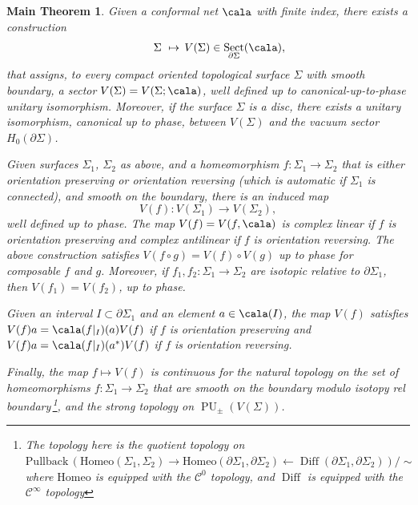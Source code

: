 \documentclass[a4paper,10pt,leqno]{amsart}
\theoremstyle{plain}
\newtheorem{maintheorem}[theorem]{Main Theorem}
\theoremstyle{definition}
\theoremstyle{remark}
\DeclareMathOperator{\Diff}{Diff}
\DeclareMathOperator{\PU}{PU}
\DeclareMathOperator{\Rep}{Sect}
\begin{document}
\begin{maintheorem}\label{Mthm: conformal blocks}
Given a conformal net $\cala$ with finite index, there exists a construction
\begin{equation}\label{eq: main thm eq1}
\qquad\Sigma\,\,\mapsto\, V(\Sigma)\in\Rep_{\partial\Sigma}(\cala),
\end{equation}
that assigns, to every compact oriented topological surface $\Sigma$ with smooth boundary, a sector $V(\Sigma)=V(\Sigma;\cala)$,
well defined up to canonical-up-to-phase unitary isomorphism.
Moreover, if the surface $\Sigma$ is a disc, there exists a unitary isomorphism, canonical up to phase, between $V(\Sigma)$ and the vacuum sector $H_0(\partial\Sigma)$.

Given surfaces $\Sigma_1$, $\Sigma_2$ as above, and a homeomorphism $f:\Sigma_1\to \Sigma_2$ that is 
either orientation preserving or orientation reversing (which is automatic if $\Sigma_1$ is connected), and smooth on the boundary,
there is an induced map
\[
V(f):V(\Sigma_1)\to V(\Sigma_2),
\]
well defined up to phase.
The map $V(f)=V(f,\cala)$ is complex linear if $f$ is orientation preserving and complex antilinear if $f$ is orientation reversing.
The above construction satisfies $V(f\circ g)=V(f)\circ V(g)$ up to phase for composable $f$ and $g$.
Moreover, if $f_1,f_2:\Sigma_1\to \Sigma_2$ are isotopic relative to $\partial \Sigma_1$,
then $V(f_1)=V(f_2)$, up to phase.

Given an interval $I\subset \partial \Sigma_1$ and an element $a\in\cala(I)$,
the map $V(f)$ satisfies $V(f)a=\cala(f|_I)(a)V(f)$ if $f$ is orientation preserving and $V(f)a=\cala(f|_I)(a^*)V(f)$ if $f$ is orientation reversing.

Finally, the map $f\mapsto V(f)$ is continuous for the natural topology on the set of homeomorphisms $f:\Sigma_1\to \Sigma_2$ that are smooth on the boundary modulo isotopy rel boundary\,\footnote{The topology here is the quotient topology on
$\mathrm{Pullback}\,(\mathrm{Homeo}(\Sigma_1,\Sigma_2)\to\mathrm{Homeo}(\partial\Sigma_1,\partial\Sigma_2)\leftarrow\Diff(\partial\Sigma_1,\partial\Sigma_2))/\sim$
where $\mathrm{Homeo}$ is equipped with the $\mathcal C^0$ topology, and $\Diff$ is equipped with the $\mathcal C^\infty$ topology}, and the strong topology on $\PU_\pm(V(\Sigma))$.
\end{maintheorem}
\end{document}

